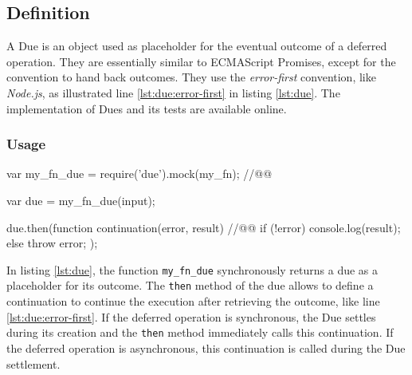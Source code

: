 
\subsection{Definition} \label{chapter5:due:definition}

A Due is an object used as placeholder for the eventual outcome of a deferred operation.
They are essentially similar to ECMAScript Promises, except for the convention to hand back outcomes.
They use the \textit{error-first} convention, like \textit{Node.js}, as illustrated line \ref{lst:due:error-first} in listing \ref{lst:due}.
The implementation of Dues and its tests are available online.

\subsubsection{Usage}

\begin{code}[js, %
             caption={Example of a due}, %
             label={lst:due}] %
var my_fn_due = require('due').mock(my_fn); //@\label{lst:due:mock}@

var due = my_fn_due(input);

due.then(function continuation(error, result) { //@\label{lst:due:error-first}@
  if (!error) {
    console.log(result);
  } else {
    throw error;
  }
});
\end{code}


In listing \ref{lst:due}, the function \texttt{my\_fn\_due} synchronously returns a due as a placeholder for its outcome.
The \texttt{then} method of the due allows to define a continuation to continue the execution after retrieving the outcome, like line \ref{lst:due:error-first}.
If the deferred operation is synchronous, the Due settles during its creation and the \texttt{then} method immediately calls this continuation.
If the deferred operation is asynchronous, this continuation is called during the Due settlement.

